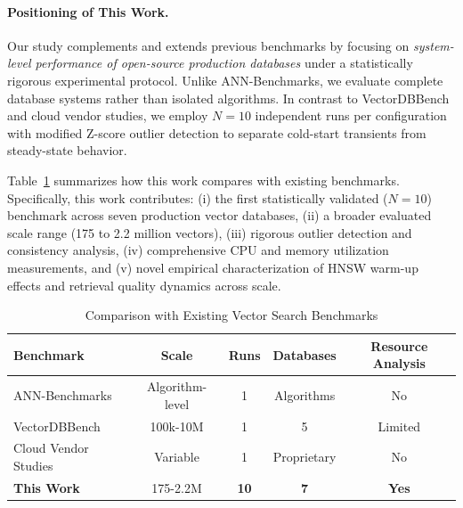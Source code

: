 \documentclass{article}
\begin{document}
\paragraph{Positioning of This Work.}
Our study complements and extends previous benchmarks by focusing on
\emph{system-level performance of open-source production databases} under a
statistically rigorous experimental protocol. Unlike ANN-Benchmarks, we evaluate
complete database systems rather than isolated algorithms. In contrast to
VectorDBBench and cloud vendor studies, we employ $N=10$ independent runs per
configuration with modified Z-score outlier detection to separate cold-start
transients from steady-state behavior.

Table~\ref{tab:related_work_comparison} summarizes how this work compares with existing benchmarks. Specifically, this work contributes:
(i) the first statistically validated ($N=10$) benchmark across seven production
vector databases,
(ii) a broader evaluated scale range (175 to 2.2 million vectors),
(iii) rigorous outlier detection and consistency analysis,
(iv) comprehensive CPU and memory utilization measurements, and
(v) novel empirical characterization of HNSW warm-up effects and retrieval
quality dynamics across scale.


\begin{table}[t]
\centering
\small
\caption{Comparison with Existing Vector Search Benchmarks}
\begin{tabular}{lcccc}
\toprule
\textbf{Benchmark} & \textbf{Scale} & \textbf{Runs} & \textbf{Databases} & \textbf{Resource Analysis} \\
\midrule
ANN-Benchmarks & Algorithm-level & 1 & Algorithms & No \\
VectorDBBench & 100k-10M & 1 & 5 & Limited \\
Cloud Vendor Studies & Variable & 1 & Proprietary & No \\
\textbf{This Work} & 175-2.2M & \textbf{10} & \textbf{7} & \textbf{Yes} \\
\bottomrule
\end{tabular}
\label{tab:related_work_comparison}
\end{table}
\end{document}
